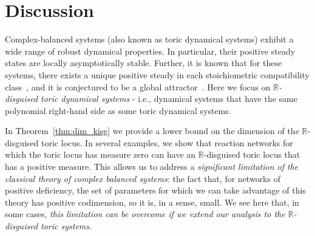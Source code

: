 \documentclass[11pt]{article}
\theoremstyle{plain}
\theoremstyle{definition}
\theoremstyle{remark}
\newcommand\RR{\mathbb{R}}
\begin{document}
\section{Discussion}
\label{sec:discussion}


Complex-balanced systems (also known as toric dynamical systems) exhibit a wide range of robust dynamical properties. In particular, their positive steady states are locally asymptotically stable. Further, it is known that for these systems, there exists a unique positive steady in each stoichiometric compatibility class~\cite{horn1972general},  and it is conjectured to be a global attractor~\cite{craciun2015toric}. Here we focus on \emph{$\RR$-disguised toric dynamical systems} - i.e., dynamical systems that have the same polynomial right-hand side as some toric dynamical systems. 

In Theorem~\ref{thm:dim_kisg} we provide a 
lower bound on the dimension of the $\RR$-disguised toric locus. In several examples, we show that reaction networks for which the toric locus has measure zero can have an $\RR$-disguised toric locus that has a positive measure. This allows us to address a {\em significant limitation of the classical theory of complex balanced systems}: the fact that, for networks of positive deficiency, the set of parameters for which we can take advantage of this theory has positive codimension, so it is, in a sense, small. We see here that, in some cases,  {\em this limitation can be overcome if we extend our analysis to the $\RR$-disguised toric systems}.
\end{document}
